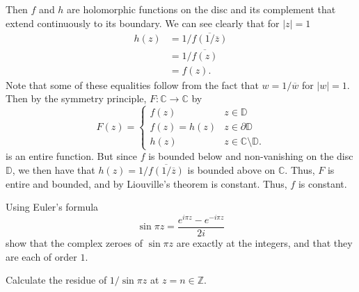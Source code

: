 \documentclass[12 pt, letterpaper]{hmcpset}
\begin{document}
\begin{solution}
	Then $f$ and $h$ are holomorphic functions on the disc and its complement that extend continuously to its boundary. We can see clearly that for $\lvert z \rvert = 1$ 
	\[
		\begin{split}
			h(z) & = 1/\overline{f(1 / \overline{z})} \\
			     & = 1/\overline{f(z)} \\
			     & = f(z).
		\end{split}
	\]
	Note that some of these equalities follow from the fact that $w = 1 / \overline{w}$ for $\lvert w \rvert = 1$. Then by the symmetry principle, $F : \mathbb{C} \to \mathbb{C}$ by
	\[
		F(z) = \begin{cases}
			f(z) & z \in \mathbb{D} \\
			f(z) = h(z) & z \in \partial \mathbb{D} \\
			h(z) & z \in \mathbb{C} \setminus \mathbb{D}.
		\end{cases}
	\]
	is an entire function. But since $f$ is bounded below and non-vanishing on the disc $\mathbb{D}$, we then have that $h(z) = 1 / \overline{f(1 /\overline{z})}$ is bounded above on $\mathbb{C}$. Thus, $F$ is entire and bounded, and by Liouville's theorem is constant. Thus, $f$ is constant.
\end{solution}

\pagebreak

\begin{problem}[1]
	Using Euler's formula
	\[
		\sin{\pi z} = \frac{e^{i \pi z} - e^{- i \pi z}}{2 i}
	\]
	show that the complex zeroes of $\sin{\pi z}$ are exactly at the integers, and that they are each of order $1$.

	Calculate the residue of $1 / \sin{\pi z}$ at $z = n \in \mathbb{Z}$.
\end{problem}
\end{document}

